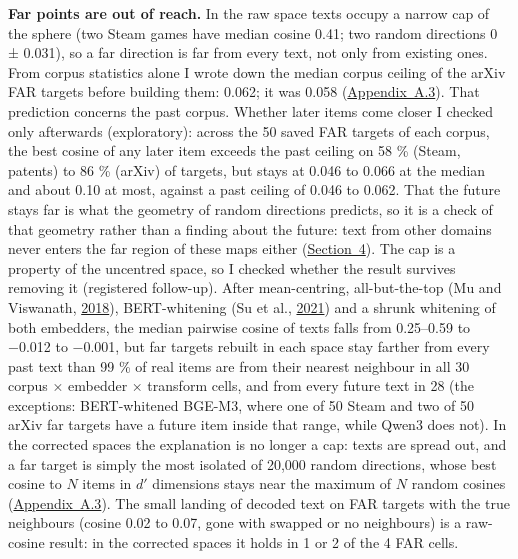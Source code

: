 \documentclass[
  10pt,
]{article}
\begin{document}
\textbf{Far points are out of reach.} In
the raw space texts occupy a narrow cap
of the sphere (two Steam games have
median cosine 0.41; two random
directions 0 ± 0.031), so a far
direction is far from every text, not
only from existing ones. From corpus
statistics alone I wrote down the median
corpus ceiling of the arXiv FAR targets
before building them: 0.062; it was
0.058
(\hyperref[app:A.3]{Appendix~A.3}). That
prediction concerns the past corpus.
Whether later items come closer I
checked only afterwards (exploratory):
across the 50 saved FAR targets of each
corpus, the best cosine of any later
item exceeds the past ceiling on 58 \%
(Steam, patents) to 86 \% (arXiv) of
targets, but stays at 0.046 to 0.066 at
the median and about 0.10 at most,
against a past ceiling of 0.046 to
0.062. That the future stays far is what
the geometry of random directions
predicts, so it is a check of that
geometry rather than a finding about the
future: text from other domains never
enters the far region of these maps
either (\hyperref[sec:4]{Section~4}).
The cap is a property of the uncentred
space, so I checked whether the result
survives removing it (registered
follow-up). After mean-centring,
all-but-the-top (Mu and Viswanath,
\hyperlink{ref-Mu2018}{2018}),
BERT-whitening (Su et al.,
\hyperlink{ref-Su2021}{2021}) and a
shrunk whitening of both embedders, the
median pairwise cosine of texts falls
from 0.25--0.59 to −0.012 to −0.001, but
far targets rebuilt in each space stay
farther from every past text than 99 \%
of real items are from their nearest
neighbour in all 30 corpus × embedder ×
transform cells, and from every future
text in 28 (the exceptions:
BERT-whitened BGE-M3, where one of 50
Steam and two of 50 arXiv far targets
have a future item inside that range,
while Qwen3 does not). In the corrected
spaces the explanation is no longer a
cap: texts are spread out, and a far
target is simply the most isolated of
20,000 random directions, whose best
cosine to \(N\) items in \(d'\)
dimensions stays near the maximum of
\(N\) random cosines
(\hyperref[app:A.3]{Appendix~A.3}). The
small landing of decoded text on FAR
targets with the true neighbours (cosine
0.02 to 0.07, gone with swapped or no
neighbours) is a raw-cosine result: in
the corrected spaces it holds in 1 or 2
of the 4 FAR cells.
\end{document}
